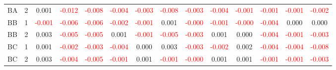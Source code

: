 \begin{table}[!htb]
{\begin{tabular}{llcccccccccccc}
BA & 2 & 0.001 & \textcolor{red}{-0.012} & \textcolor{red}{-0.008} & \textcolor{red}{-0.004} & \textcolor{red}{-0.003} & \textcolor{red}{-0.008} & \textcolor{red}{-0.003} & \textcolor{red}{-0.004} & \textcolor{red}{-0.001} & \textcolor{red}{-0.001} & \textcolor{red}{-0.001} & \textcolor{red}{-0.002}\\
BB & 1 & \textcolor{red}{-0.001} & \textcolor{red}{-0.006} & \textcolor{red}{-0.006} & \textcolor{red}{-0.002} & \textcolor{red}{-0.001} & 0.001 & \textcolor{red}{-0.000} & \textcolor{red}{-0.001} & \textcolor{red}{-0.000} & \textcolor{red}{-0.004} & 0.000 & 0.000\\
BB & 2 & 0.003 & \textcolor{red}{-0.005} & \textcolor{red}{-0.005} & 0.001 & \textcolor{red}{-0.001} & \textcolor{red}{-0.005} & \textcolor{red}{-0.003} & 0.001 & 0.000 & \textcolor{red}{-0.004} & \textcolor{red}{-0.001} & \textcolor{red}{-0.003}\\
BC & 1 & 0.001 & \textcolor{red}{-0.002} & \textcolor{red}{-0.003} & \textcolor{red}{-0.004} & 0.000 & 0.003 & \textcolor{red}{-0.003} & \textcolor{red}{-0.002} & 0.002 & \textcolor{red}{-0.004} & \textcolor{red}{-0.004} & \textcolor{red}{-0.008}\\
BC & 2 & 0.003 & \textcolor{red}{-0.004} & \textcolor{red}{-0.005} & \textcolor{red}{-0.001} & 0.001 & \textcolor{red}{-0.001} & \textcolor{red}{-0.000} & 0.001 & 0.001 & \textcolor{red}{-0.001} & \textcolor{red}{-0.001} & \textcolor{red}{-0.003}\\
\hline
    \end{tabular}%
    }
\end{table}

